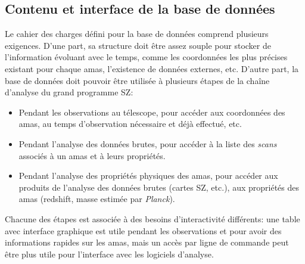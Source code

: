 \subsection{Contenu et interface de la base de données}

Le cahier des charges défini pour la base de données comprend plusieurs exigences.
D'une part, sa structure doit être assez souple pour stocker de l'information évoluant avec le temps, comme les coordonnées les plus précises existant pour chaque amas, l'existence de données externes, etc.
D'autre part, la base de données doit pouvoir être utilisée à plusieurs étapes de la chaîne d'analyse du grand programme SZ:
\begin{itemize}[leftmargin=*]
\setlength\itemsep{0pt}
\item Pendant les observations au télescope, pour accéder aux coordonnées des amas, au temps d'observation nécessaire et déjà effectué, etc.
\item Pendant l'analyse des données brutes, pour accéder à la liste des \textit{scans} associés à un amas et à leurs propriétés.
\item Pendant l'analyse des propriétés physiques des amas, pour accéder aux produits de l'analyse des données brutes (cartes SZ, etc.), aux propriétés des amas (redshift, masse estimée par \textit{Planck}).
\end{itemize}
Chacune des étapes est associée à des besoins d'interactivité différents: une table avec interface graphique est utile pendant les observations et pour avoir des informations rapides sur les amas, mais un accès par ligne de commande peut être plus utile pour l'interface avec les logiciels d'analyse.

